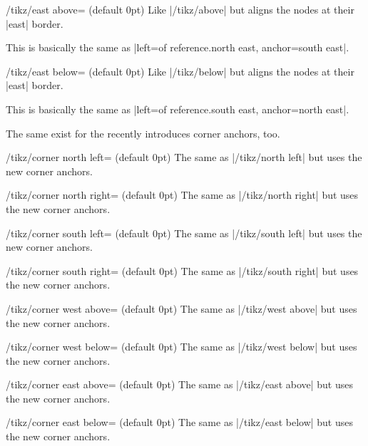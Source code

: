 \begin{stylekey}{/tikz/east above= (default 0pt)}
  Like |/tikz/above| but aligns the nodes at their |east| border.
  
  This is basically the same as |left=of reference.north east, anchor=south east|.
\end{stylekey}
\begin{stylekey}{/tikz/east below= (default 0pt)}
  Like |/tikz/below| but aligns the nodes at their |east| border.
  
  This is basically the same as |left=of reference.south east, anchor=north east|.
\end{stylekey}

The same exist for the recently introduces corner anchors, too.
\begin{stylekey}{/tikz/corner north left= (default 0pt)}
  The same as |/tikz/north left| but uses the new corner anchors.
\end{stylekey}
\begin{stylekey}{/tikz/corner north right= (default 0pt)}
  The same as |/tikz/north right| but uses the new corner anchors.
\end{stylekey}
\begin{stylekey}{/tikz/corner south left= (default 0pt)}
  The same as |/tikz/south left| but uses the new corner anchors.
\end{stylekey}
\begin{stylekey}{/tikz/corner south right= (default 0pt)}
  The same as |/tikz/south right| but uses the new corner anchors.
\end{stylekey}
\begin{stylekey}{/tikz/corner west above= (default 0pt)}
  The same as |/tikz/west above| but uses the new corner anchors.
\end{stylekey}
\begin{stylekey}{/tikz/corner west below= (default 0pt)}
  The same as |/tikz/west below| but uses the new corner anchors.
\end{stylekey}
\begin{stylekey}{/tikz/corner east above= (default 0pt)}
  The same as |/tikz/east above| but uses the new corner anchors.
\end{stylekey}
\begin{stylekey}{/tikz/corner east below= (default 0pt)}
  The same as |/tikz/east below| but uses the new corner anchors.
\end{stylekey}

